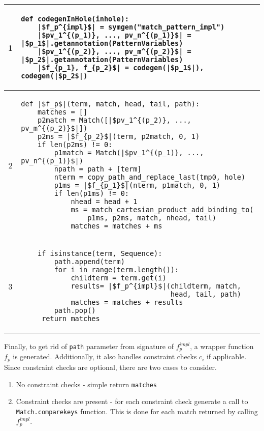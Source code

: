 \begin{tabular}{|c|p{}|}
\hline 
\cellcolor{blue}1 & 
\begin{verbatim}
def codegenInHole(inhole):
	|$f_p^{impl}$| = symgen("match_pattern_impl")
	|$pv_1^{(p_1)}, ..., pv_n^{(p_1)}$| = |$p_1$|.getannotation(PatternVariables)
	|$pv_1^{(p_2)}, ..., pv_m^{(p_2)}$| = |$p_2$|.getannotation(PatternVariables)
	|$f_{p_1}, f_{p_2}$| = codegen(|$p_1$|), codegen(|$p_2$|)
\end{verbatim} 
\\
\hline 
\cellcolor{red}2 &
\begin{verbatim}
def |$f_p$|(term, match, head, tail, path):
	matches = []
	p2match = Match([|$pv_1^{(p_2)}, ..., pv_m^{(p_2)}$|])
	p2ms = |$f_{p_2}$|(term, p2match, 0, 1)
	if len(p2ms) != 0:
		p1match = Match(|$pv_1^{(p_1)}, ..., pv_n^{(p_1)}$|)
		npath = path + [term]
		nterm = copy_path_and_replace_last(tmp0, hole)
		p1ms = |$f_{p_1}$|(nterm, p1match, 0, 1)
		if len(p1ms) != 0:
			nhead = head + 1
			ms = match_cartesian_product_add_binding_to(
				p1ms, p2ms, match, nhead, tail)
			matches = matches + ms
\end{verbatim} 
\\
\hline
\cellcolor{green}3 & 
\begin{verbatim}
	if isinstance(term, Sequence):
		path.append(term)
		for i in range(term.length()):
			childterm = term.get(i)
			results= |$f_p^{impl}$|(childterm, match, 
								    head, tail, path)
			matches = matches + results 
		path.pop()
	 return matches 
\end{verbatim} 
\\
\hline
\end{tabular}


Finally, to get rid of \texttt{path} parameter from signature of $f_p^{impl}$, a wrapper function $f_p$ is generated. Additionally, it also handles constraint checks $c_i$ if applicable. Since constraint checks are optional, there are two cases to consider.

\begin{enumerate}
\item No constraint checks - simple return \texttt{matches}
\item Constraint checks are present - for each constraint check generate a call to \texttt{Match.comparekeys} function. This is done for each match returned by calling $f_p^{impl}$.
\end{enumerate}

